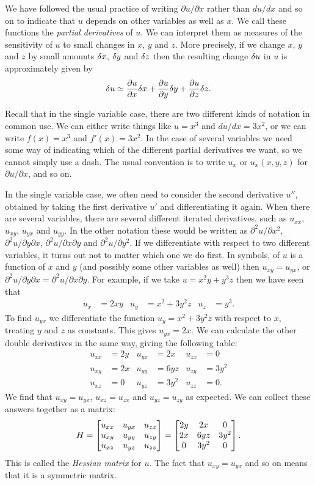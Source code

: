 \documentclass[reqno]{amsart}
\theoremstyle{definition}
\begin{document}
We have followed the usual practice of writing $\partial u/\partial x$
rather than $du/dx$ and so on to indicate that $u$ depends on other
variables as well as $x$.  We call these functions the \emph{partial
 derivatives} of $u$.  We can interpret them as measures of the
sensitivity of $u$ to small changes in $x$, $y$ and $z$.  More
precisely, if we change $x$, $y$ and $z$ by small amounts $\delta x$,
$\delta y$ and $\delta z$ then the resulting change $\delta u$ in $u$ is
approximately given by 
\[ \delta u \simeq
     \frac{\partial u}{\partial x}\delta x +
     \frac{\partial u}{\partial y}\delta y +
     \frac{\partial u}{\partial z}\delta z. 
\]

Recall that in the single variable case, there are two different kinds
of notation in common use.  We can either write things like $u=x^3$
and $du/dx=3x^2$, or we can write $f(x)=x^3$ and $f'(x)=3x^2$.  In the
case of several variables we need some way of indicating which of the
different partial derivatives we want, so we cannot simply use a
dash.  The usual convention is to write $u_x$ or $u_x(x,y,z)$ for
$\partial u/\partial x$, and so on.

In the single variable case, we often need to consider the second
derivative $u''$, obtained by taking the first derivative $u'$ and
differentiating it again.  When there are several variables, there are
several different iterated derivatives, such as $u_{xx}$, $u_{xy}$,
$u_{yx}$ and $u_{yy}$.  In the other notation these would be written
as $\partial^2u/\partial x^2$, $\partial^2u/\partial y\partial x$, 
$\partial^2u/\partial x\partial y$ and $\partial^2u/\partial y^2$.  If
we differentiate with respect to two different variables, it turns out
not to matter which one we do first.  In symbols, of $u$ is a function
of $x$ and $y$ (and possibly some other variables as well) then
$u_{xy}=u_{yx}$, or
$\partial^2u/\partial y\partial x=\partial^2u/\partial x\partial y$.
For example, if we take $u=x^2y+y^3z$ then we have seen that
\begin{align*}
 u_x &= 2xy & u_y &= x^2+3y^2z & u_z &= y^3.
\end{align*}
To find $u_{yx}$ we differentiate the function $u_y=x^2+3y^2z$ with
respect to $x$, treating $y$ and $z$ as constants.  This gives
$u_{yx}=2x$.  We can calculate the other double derivatives in the
same way, giving the following table:
\begin{align*}
 u_{xx} &= 2y & u_{yx} &= 2x   & u_{zx} &= 0 \\
 u_{xy} &= 2x & u_{yy} &= 6yz  & u_{zy} &= 3y^2 \\
 u_{xz} &= 0  & u_{yz} &= 3y^2 & u_{zz} &= 0. 
\end{align*}
We find that $u_{xy}=u_{yx}$, $u_{xz}=u_{zx}$ and $u_{yz}=u_{zy}$ as
expected.  We can collect these answers together as a matrix:
\[ H =
    \left[\begin{matrix} u_{xx} & u_{yx} & u_{zx} \\
         u_{xy} & u_{yy} & u_{zy} \\
         u_{xz} & u_{yz} & u_{zz} \end{matrix}\right] = 
    \left[\begin{matrix} 2y & 2x & 0 \\ 2x & 6yz & 3y^2 \\ 0 & 3y^2 & 0 \end{matrix}\right].
\]
This is called the \emph{Hessian matrix} for $u$.  The fact that
$u_{xy}=u_{yx}$ and so on means that it is a symmetric matrix.
\end{document}
